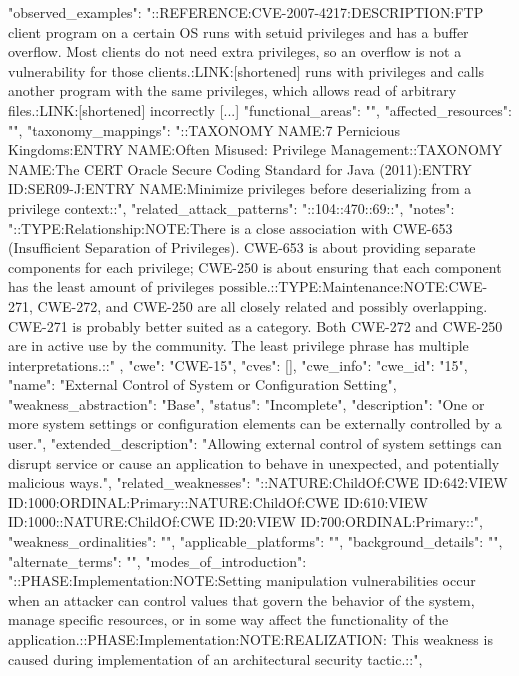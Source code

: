 \begin{code}
{{{{{        "observed_examples": "::REFERENCE:CVE-2007-4217:DESCRIPTION:FTP client program on a certain OS runs with setuid privileges and has a buffer overflow. Most clients do not need extra privileges, so an overflow is not a vulnerability for those clients.:LINK:[shortened] runs with privileges and calls another program with the same privileges, which allows read of arbitrary files.:LINK:[shortened] incorrectly [...]
        "functional_areas": "",
        "affected_resources": "",
        "taxonomy_mappings": "::TAXONOMY NAME:7 Pernicious Kingdoms:ENTRY NAME:Often Misused: Privilege Management::TAXONOMY NAME:The CERT Oracle Secure Coding Standard for Java (2011):ENTRY ID:SER09-J:ENTRY NAME:Minimize privileges before deserializing from a privilege context::",
        "related_attack_patterns": "::104::470::69::",
        "notes": "::TYPE:Relationship:NOTE:There is a close association with CWE-653 (Insufficient Separation of Privileges). CWE-653 is about providing separate components for each privilege; CWE-250 is about ensuring that each component has the least amount of privileges possible.::TYPE:Maintenance:NOTE:CWE-271, CWE-272, and CWE-250 are all closely related and possibly overlapping. CWE-271 is probably better suited as a category. Both CWE-272 and CWE-250 are in active use by the community. The least privilege phrase has multiple interpretations.::"
       }
      },
      {
       "cwe": "CWE-15",
       "cves": [],
       "cwe_info": {
        "cwe_id": "15",
        "name": "External Control of System or Configuration Setting",
        "weakness_abstraction": "Base",
        "status": "Incomplete",
        "description": "One or more system settings or configuration elements can be externally controlled by a user.",
        "extended_description": "Allowing external control of system settings can disrupt service or cause an application to behave in unexpected, and potentially malicious ways.",
        "related_weaknesses": "::NATURE:ChildOf:CWE ID:642:VIEW ID:1000:ORDINAL:Primary::NATURE:ChildOf:CWE ID:610:VIEW ID:1000::NATURE:ChildOf:CWE ID:20:VIEW ID:700:ORDINAL:Primary::",
        "weakness_ordinalities": "",
        "applicable_platforms": "",
        "background_details": "",
        "alternate_terms": "",
        "modes_of_introduction": "::PHASE:Implementation:NOTE:Setting manipulation vulnerabilities occur when an attacker can control values that govern the behavior of the system, manage specific resources, or in some way affect the functionality of the application.::PHASE:Implementation:NOTE:REALIZATION: This weakness is caused during implementation of an architectural security tactic.::",
}}}}}
\end{code}
